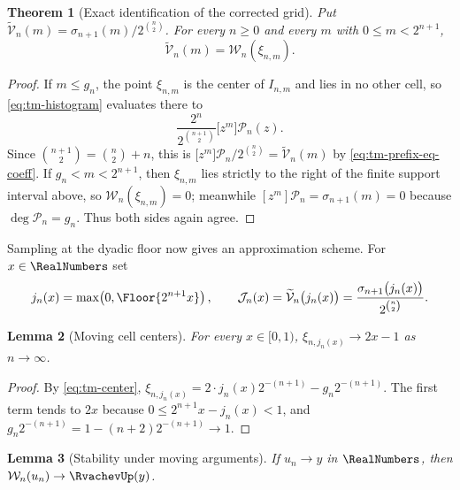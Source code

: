 \documentclass[11pt,oneside]{article}
\newtheorem{theorem}{Theorem}[section]
\newtheorem{lemma}[theorem]{Lemma}
\theoremstyle{definition}
\theoremstyle{remark}
\begin{document}
\begin{theorem}[Exact identification of the corrected grid]
\label{thm:tm-histogram-identity}
Put $\widetilde{\mathcal V}_n(m)=\sigma_{n+1}(m)/2^{\binom n2}$.  For every $n\ge0$ and
every $m$ with $0\le m<2^{n+1}$,
\begin{equation}
 \widetilde{\mathcal V}_n(m)=\mathcal W_n(\xi_{n,m}).          \label{eq:tm-grid-eq-histogram}
\end{equation}
\end{theorem}

\begin{proof}
If $m\le g_n$, the point $\xi_{n,m}$ is the center of $I_{n,m}$ and lies in no other cell,
so \eqref{eq:tm-histogram} evaluates there to
\begin{equation*}
 \frac{2^{n}}{2^{\binom{n+1}2}}\bigl[z^m\bigr]\mathcal P_n(z).
\end{equation*}
Since $\binom{n+1}2=\binom n2+n$, this is
$\bigl[z^m\bigr]\mathcal P_n/2^{\binom n2}=\widetilde{\mathcal V}_n(m)$ by
\eqref{eq:tm-prefix-eq-coeff}.  If $g_n<m<2^{n+1}$, then $\xi_{n,m}$ lies strictly to the
right of the finite support interval above, so $\mathcal W_n(\xi_{n,m})=0$; meanwhile
$[z^m]\mathcal P_n=\sigma_{n+1}(m)=0$ because $\deg\mathcal P_n=g_n$.  Thus both sides
again agree.
\end{proof}

Sampling at the dyadic floor now gives an approximation scheme.  For $x\in\RealNumbers$ set
\begin{equation}
 j_n(x)=\max\!\left(0,\Floor{2^{n+1}x}\right),
 \qquad
 \mathcal J_n(x)=\widetilde{\mathcal V}_n\bigl(j_n(x)\bigr)
 =\frac{\sigma_{n+1}\bigl(j_n(x)\bigr)}{2^{\binom n2}}.    \label{eq:tm-sample}
\end{equation}

\begin{lemma}[Moving cell centers]
\label{thm:tm-moving-center}
For every $x\in[0,1)$, $\xi_{n,j_n(x)}\to2x-1$ as $n\to\infty$.
\end{lemma}

\begin{proof}
By \eqref{eq:tm-center},
$\xi_{n,j_n(x)}=2\cdot j_n(x)2^{-(n+1)}-g_n2^{-(n+1)}$.  The first term tends to
$2x$ because $0\le2^{n+1}x-j_n(x)<1$, and
$g_n2^{-(n+1)}=1-(n+2)2^{-(n+1)}\to1$.
\end{proof}

\begin{lemma}[Stability under moving arguments]
\label{thm:tm-moving}
If $u_n\to y$ in $\RealNumbers$, then $\mathcal W_n(u_n)\to\RvachevUp(y)$.
\end{lemma}
\end{document}
